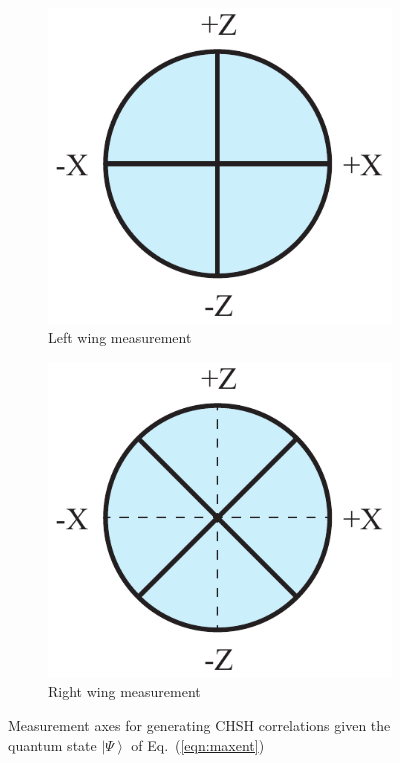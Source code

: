 \documentclass[12pt,onecolumn,nofootinbib]{revtex4-2}
\begin{document}
\begin{figure}[h]
	        \begin{subfigure}[b]{0.18\textwidth}
                	\centering
                	\includegraphics[width=\textwidth]{alice}
		\caption{Left wing measurement}
		\label{fig:alice-chsh}
	\end{subfigure}
        \hspace{8em}
        \begin{subfigure}[b]{0.18\textwidth}
                	\centering
                	\includegraphics[width=\textwidth]{bob-chsh}
             	\caption{Right wing measurement}
                	\label{fig:bob-chsh}
        \end{subfigure}
 \caption{Measurement axes for generating CHSH correlations given the quantum state $\left\vert \Psi \right\rangle$ of Eq.~(\ref{eqn:maxent})}
\label{fig:chsh-meas}
\end{figure}
\end{document}
